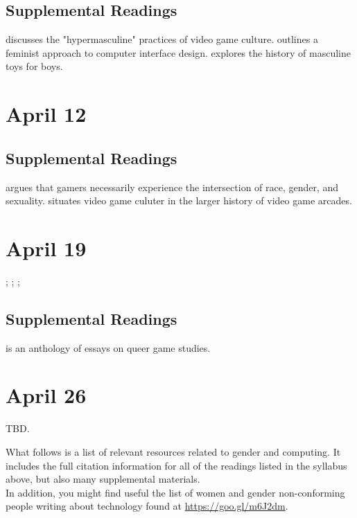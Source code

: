 \documentclass[11pt]{article}
\begin{document}

\subsection{Supplemental Readings}
\label{sec:org4079b1b}

\cite{Salter:2012fa} discusses the "hypermasculine" practices of video game culture.  \cite{Bardzell:2010dv} outlines a feminist approach to computer interface design. \cite{Varney:2002en} explores the history of masculine toys for boys.  

\section{April 12}
\label{sec:orge00144e}


\subsection{Supplemental Readings}
\label{sec:orgb329030}

\cite{Shaw:2015dr} argues that gamers necessarily experience the intersection of race, gender, and sexuality.  \cite{Kocurek:2015cg} situates video game culuter in the larger history of video game arcades.

\section{April 19}
\label{sec:orga889f99}

; ; ; \cite{Gray:2014uj}

\subsection{Supplemental Readings}
\label{sec:org725b302}

\cite{Ruberg:2017ww} is an anthology of essays on queer game studies.

\section{April 26}
\label{sec:org1907822}

TBD.

\newpage

What follows is a list of relevant resources related to gender and
computing.  It includes the full citation information for all of the readings
listed in the syllabus above, but also many supplemental materials.\\

In addition, you might find useful the list of women and gender non-conforming
people writing about technology found at \url{https://goo.gl/m6J2dm}.\\


\nocite{*} 
\printbibliography
\end{document}

